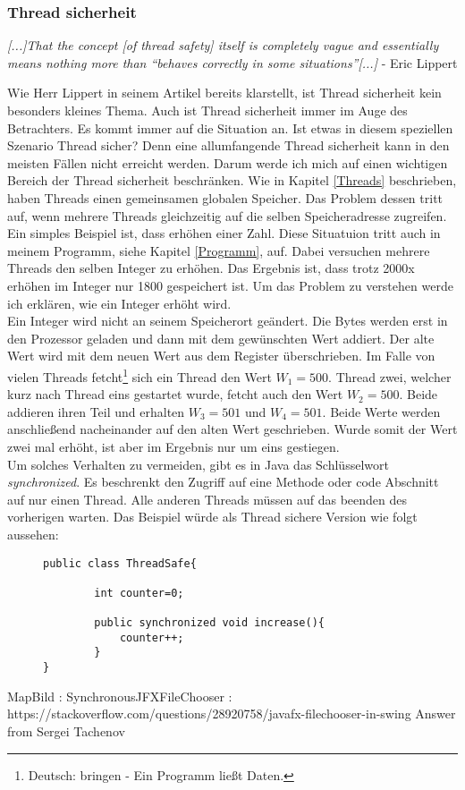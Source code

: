 \subsubsection{Thread sicherheit}
\begin{center}
    \textit{
        [...]That the concept [of thread safety] itself is completely vague and essentially means nothing more than ``behaves correctly in some situations''[...]
    } - Eric Lippert \cite{Threads:Lippert}
\end{center}

Wie Herr Lippert in seinem Artikel bereits klarstellt, ist Thread sicherheit kein besonders kleines Thema. Auch ist Thread sicherheit immer im Auge des Betrachters. Es kommt immer auf die Situation an. Ist etwas in diesem speziellen Szenario Thread sicher? Denn eine allumfangende Thread sicherheit kann in den meisten Fällen nicht erreicht werden. Darum werde ich mich auf einen wichtigen Bereich der Thread sicherheit beschränken.
\medskip
\newline
Wie in Kapitel \ref{Threads} beschrieben, haben Threads einen gemeinsamen globalen Speicher. Das Problem dessen tritt auf, wenn mehrere Threads gleichzeitig auf die selben Speicheradresse zugreifen. Ein simples Beispiel ist, dass erhöhen einer Zahl. Diese Situatuion tritt auch in meinem Programm, siehe Kapitel \ref{Programm}, auf. Dabei versuchen mehrere Threads den selben Integer zu erhöhen. Das Ergebnis ist, dass trotz 2000x erhöhen im Integer nur 1800 gespeichert ist. Um das Problem zu verstehen werde ich erklären, wie ein Integer erhöht wird.\\
Ein Integer wird nicht an seinem Speicherort geändert. Die Bytes werden erst in den Prozessor geladen und dann mit dem gewünschten Wert addiert. Der alte Wert wird mit dem neuen Wert aus dem Register überschrieben. Im Falle von vielen Threads fetcht\footnote{Deutsch: bringen - Ein Programm ließt Daten.} sich ein Thread den Wert $W_1 = 500$. Thread zwei, welcher kurz nach Thread eins gestartet wurde, fetcht auch den Wert $W_2 = 500$. Beide addieren ihren Teil und erhalten $W_3 = 501$ und $W_4 = 501$. Beide Werte werden anschließend nacheinander auf den alten Wert geschrieben. Wurde somit der Wert zwei mal erhöht, ist aber im Ergebnis nur um eins gestiegen.\cite{ThreadInterference:Oracle}\\
Um solches Verhalten zu vermeiden, gibt es in Java das Schlüsselwort \textit{synchronized}. Es beschrenkt den Zugriff auf eine Methode oder code Abschnitt auf nur einen Thread. Alle anderen Threads müssen auf das beenden des vorherigen warten. Das Beispiel würde als Thread sichere Version wie folgt aussehen: \cite{SynchronizedMethods:Oracle}
\begin{figure}[h]
    \begin{lstlisting}
public class ThreadSafe{

        int counter=0;

        public synchronized void increase(){
            counter++;
        }
}
    \end{lstlisting}
\end{figure}

MapBild :
SynchronousJFXFileChooser : https://stackoverflow.com/questions/28920758/javafx-filechooser-in-swing
Answer from Sergei Tachenov